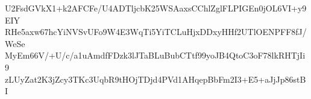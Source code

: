 U2FsdGVkX1+k2AFCFe/U4ADTljcbK25WSAaxsCChlZglFLPIGEn0jOL6VI+y9EIY
RHe5axw67hcYiNVSvUFo9W4E3WqTi5YiTCLuHjxDDxyHHf2UTlOENPFF8fJ/WeSe
MyEm66V/+U/c/a1uAmdfFDzk3lJTaBLuBubCTtf99yoJB4QtoC3oF78lkRHTjIi9
zLUyZat2K3jZcy3TKc3UqbR9tHOjTDjd4PVd1AHqepBbFm2I3+E5+aJjJp86stBI
